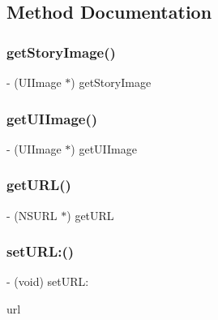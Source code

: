 \subsection{Method Documentation}
\hypertarget{interface_content_a9297294e3130d00ad17e3a4c06a6c6ef}{}\label{interface_content_a9297294e3130d00ad17e3a4c06a6c6ef} 
\subsubsection{\texorpdfstring{get\+Story\+Image()}{getStoryImage()}}
{\footnotesize\ttfamily -\/ (U\+I\+Image $\ast$) get\+Story\+Image \begin{DoxyParamCaption}{ }\end{DoxyParamCaption}}

\hypertarget{interface_content_ac7de6656438d2919522812c65fd13875}{}\label{interface_content_ac7de6656438d2919522812c65fd13875} 
\subsubsection{\texorpdfstring{get\+U\+I\+Image()}{getUIImage()}}
{\footnotesize\ttfamily -\/ (U\+I\+Image $\ast$) get\+U\+I\+Image \begin{DoxyParamCaption}{ }\end{DoxyParamCaption}}

\hypertarget{interface_content_a2a62c53bbd40efbd68e49ac6a4099574}{}\label{interface_content_a2a62c53bbd40efbd68e49ac6a4099574} 
\subsubsection{\texorpdfstring{get\+U\+R\+L()}{getURL()}}
{\footnotesize\ttfamily -\/ (N\+S\+U\+RL $\ast$) get\+U\+RL \begin{DoxyParamCaption}{ }\end{DoxyParamCaption}}

\hypertarget{interface_content_a75f21306b827638829a946fe33fefab7}{}\label{interface_content_a75f21306b827638829a946fe33fefab7} 
\subsubsection{\texorpdfstring{set\+U\+R\+L\+:()}{setURL:()}}
{\footnotesize\ttfamily -\/ (void) set\+U\+R\+L\+: \begin{DoxyParamCaption}\item[{(N\+S\+U\+RL $\ast$)}]{url }\end{DoxyParamCaption}}



